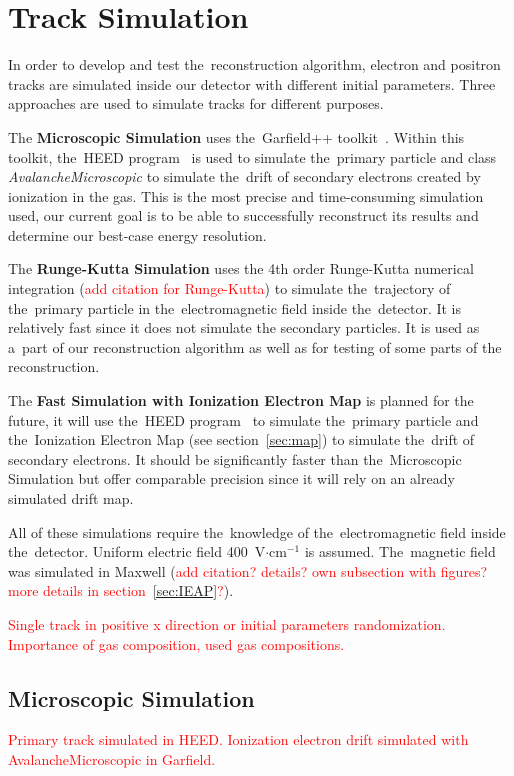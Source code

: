 \chapter{Track Simulation}
	In order to develop and test the~reconstruction algorithm, electron and positron tracks are simulated inside our detector with different initial parameters. Three approaches are used to simulate tracks for different purposes.
	
	The \textbf{Microscopic Simulation} uses the~Garfield++ toolkit~\cite{Garfield++}. Within this toolkit, the~\ac{HEED} program~\cite{HEED} is used to simulate the~primary particle and class \textit{AvalancheMicroscopic} to simulate the~drift of secondary electrons created by ionization in the gas. This is the most precise and time-consuming simulation used, our current goal is to be able to successfully reconstruct its results and determine our best-case energy resolution.
	
	The \textbf{Runge-Kutta Simulation} uses the 4th order Runge-Kutta numerical integration (\textcolor{red}{add citation for Runge-Kutta}) to simulate the~trajectory of the~primary particle in the~electromagnetic field inside the~detector. It is relatively fast since it does not simulate the secondary particles. It is used as a~part of our reconstruction algorithm as well as for testing of some parts of the reconstruction.
	
	The \textbf{Fast Simulation with Ionization Electron Map} is planned for the future, it will use the~\ac{HEED} program~\cite{HEED} to simulate the~primary particle and the~Ionization Electron Map (see section~\ref{sec:map}) to simulate the~drift of secondary electrons. It should be significantly faster than the~Microscopic Simulation but offer comparable precision since it will rely on an already simulated drift map.
	
	All of these simulations require the~knowledge of the~electromagnetic field inside the~detector. Uniform electric field 400~V$\cdot$cm$^{-1}$ is assumed. The~magnetic field was simulated in Maxwell (\textcolor{red}{add citation? details? own subsection with figures? more details in section~\ref{sec:IEAP}?}).
	
	\textcolor{red}{Single track in positive x direction or initial parameters randomization. Importance of gas composition, used gas compositions.}
	
	\section{Microscopic Simulation}
		\textcolor{red}{Primary track simulated in HEED. Ionization electron drift simulated with AvalancheMicroscopic in Garfield.}
		
